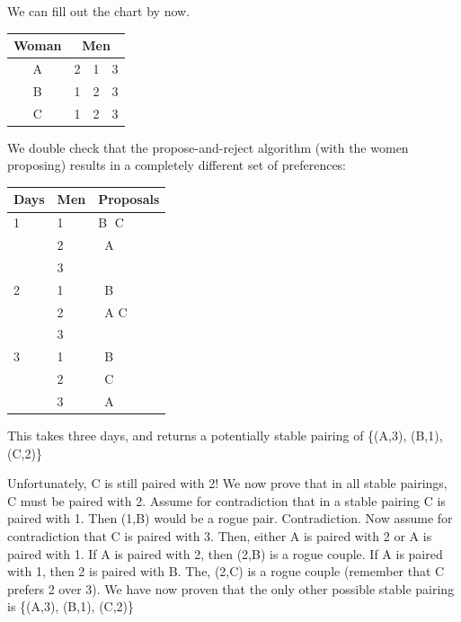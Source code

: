 \documentclass[11pt]{article}
\begin{document}
\begin{qunlist}
\begin{itemize}
We can fill out the chart by now.

\begin{center}
\begin{tabular}{|c|ccc|}\hline 
Woman&\multicolumn{3}{|c|}{Men}\\\hline 
A&2&1&3\\\hline 
B&1&2&3\\\hline 
C&1&2&3\\\hline
\end{tabular}
\end{center}

We double check that the propose-and-reject algorithm (with the women proposing) 
results in a completely different set of preferences:

\begin{center}
    \begin{tabular}{| l | l | l |}
    \hline
    Days & Men & Proposals \\ \hline
     1 & 1 & \textcircled{B} C \\ 
       & 2 & \ A \\ 
       & 3 &  \\ \hline
     2 & 1 & \ B \\ 
       & 2 &   \ A \textcircled{C} \\ 
       & 3 &  \\ \hline
     3 & 1 & \ B \\ 
       & 2 & \ C\\ 
       & 3 & \ A \\ \hline
    \end{tabular}
\end{center}
This takes three days, and returns a potentially stable pairing of \{(A,3), (B,1), (C,2)\}

Unfortunately, C is still paired with 2! We now prove that in all stable pairings, C must be paired with 2. 
Assume for contradiction that in a stable pairing C is paired with 1. 
Then (1,B) would be a rogue pair. Contradiction. 
Now assume for contradiction that C is paired with 3. Then, either A is paired with 2 or A is paired with 1. 
If A is paired with 2, then (2,B) is a rogue couple. If A is paired with 1, then 2 is paired with B. 
The, (2,C) is a rogue couple (remember that C prefers 2 over 3).
We have now proven that the only other possible stable pairing is \{(A,3), (B,1), (C,2)\}
\fi




\end{itemize}
\end{qunlist}
\end{document}
